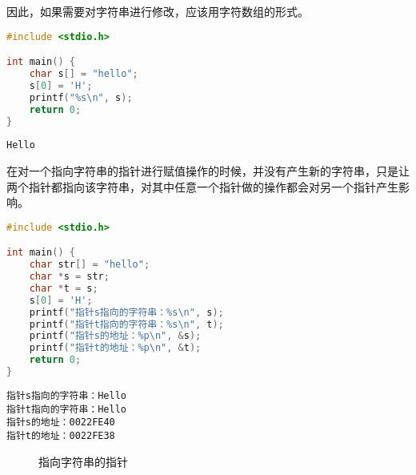 因此，如果需要对字符串进行修改，应该用字符数组的形式。\\


\begin{lstlisting}[language=C]
#include <stdio.h>

int main() {
    char s[] = "hello";
    s[0] = 'H';
    printf("%s\n", s);
    return 0;
}
\end{lstlisting}

\begin{tcolorbox}
    \begin{verbatim}
Hello
	\end{verbatim}
\end{tcolorbox}

在对一个指向字符串的指针进行赋值操作的时候，并没有产生新的字符串，只是让两个指针都指向该字符串，对其中任意一个指针做的操作都会对另一个指针产生影响。\\


\begin{lstlisting}[language=C]
#include <stdio.h>

int main() {
    char str[] = "hello";
    char *s = str;
    char *t = s;
    s[0] = 'H';
    printf("指针s指向的字符串：%s\n", s);
    printf("指针t指向的字符串：%s\n", t);
    printf("指针s的地址：%p\n", &s);
    printf("指针t的地址：%p\n", &t);
    return 0;
}
\end{lstlisting}

\begin{tcolorbox}
    \begin{verbatim}
指针s指向的字符串：Hello
指针t指向的字符串：Hello
指针s的地址：0022FE40
指针t的地址：0022FE38
	\end{verbatim}
\end{tcolorbox}

\begin{figure}[H]
    \centering
    \caption{指向字符串的指针}
\end{figure}

